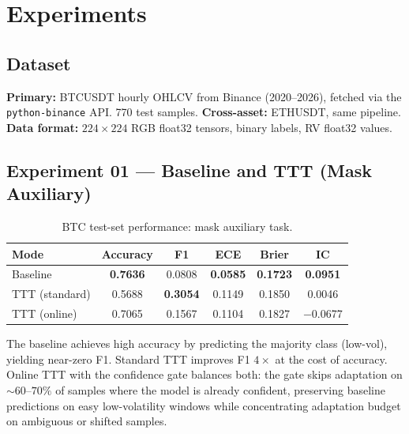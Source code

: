\documentclass[11pt]{article}
\begin{document}
\section{Experiments}
\label{sec:experiments}

\subsection{Dataset}
\label{sec:dataset}

\textbf{Primary:} BTCUSDT hourly OHLCV from Binance (2020--2026), fetched via the
\texttt{python-binance} API. 770 test samples.
\textbf{Cross-asset:} ETHUSDT, same pipeline.
\textbf{Data format:} $224\!\times\!224$ RGB float32 tensors, binary labels, RV float32
values.

\subsection{Experiment 01 --- Baseline and TTT (Mask Auxiliary)}
\label{sec:exp01}

\begin{table}[H]
  \centering
  \caption{BTC test-set performance: mask auxiliary task.}
  \label{tab:exp01}
  \begin{tabular}{lccccc}
    \toprule
    Mode & Accuracy & F1 & ECE & Brier & IC \\
    \midrule
    Baseline        & \textbf{0.7636} & 0.0808          & \textbf{0.0585} & \textbf{0.1723} & \textbf{0.0951} \\
    TTT (standard)  & 0.5688          & \textbf{0.3054} & 0.1149          & 0.1850          & 0.0046          \\
    TTT (online)    & 0.7065          & 0.1567          & 0.1104          & 0.1827          & $-$0.0677       \\
    \bottomrule
  \end{tabular}
\end{table}

The baseline achieves high accuracy by predicting the majority class (low-vol), yielding
near-zero F1. Standard TTT improves F1 $4\!\times$ at the cost of accuracy. Online TTT
with the confidence gate balances both: the gate skips adaptation on ${\sim}60$--$70\%$ of
samples where the model is already confident, preserving baseline predictions on easy
low-volatility windows while concentrating adaptation budget on ambiguous or shifted
samples.
\end{document}

